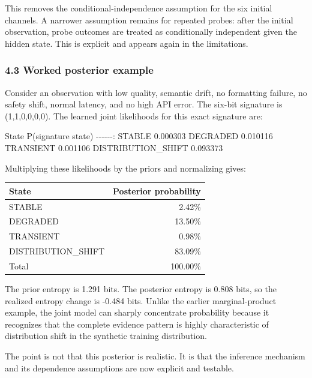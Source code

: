 \documentclass[
]{article}
\begin{document}
This removes the conditional-independence assumption for the six initial channels. A narrower assumption remains for repeated probes: after the initial observation, probe outcomes are treated as conditionally independent given the hidden state. This is explicit and appears again in the limitations.

\subsubsection{4.3 Worked posterior example}\label{43-worked-posterior-example}

Consider an observation with low quality, semantic drift, no formatting failure, no safety shift, normal latency, and no high API error. The six-bit signature is (1,1,0,0,0,0). The learned joint likelihoods for this exact signature are:

\textbar{} State \textbar{} P(signature \textbar{} state) \textbar{} \textbar-\/-\/-\textbar-\/-\/-:\textbar{} \textbar{} STABLE \textbar{} 0.000303 \textbar{} \textbar{} DEGRADED \textbar{} 0.010116 \textbar{} \textbar{} TRANSIENT \textbar{} 0.001106 \textbar{} \textbar{} DISTRIBUTION\_SHIFT \textbar{} 0.093373 \textbar{}

Multiplying these likelihoods by the priors and normalizing gives:

\begin{longtable}[]{@{}lr@{}}
\toprule\noalign{}
State & Posterior probability \\
\midrule\noalign{}
\endhead
\bottomrule\noalign{}
\endlastfoot
STABLE & 2.42\% \\
DEGRADED & 13.50\% \\
TRANSIENT & 0.98\% \\
DISTRIBUTION\_SHIFT & 83.09\% \\
Total & 100.00\% \\
\end{longtable}

The prior entropy is 1.291 bits. The posterior entropy is 0.808 bits, so the realized entropy change is -0.484 bits. Unlike the earlier marginal-product example, the joint model can sharply concentrate probability because it recognizes that the complete evidence pattern is highly characteristic of distribution shift in the synthetic training distribution.

The point is not that this posterior is realistic. It is that the inference mechanism and its dependence assumptions are now explicit and testable.
\end{document}
